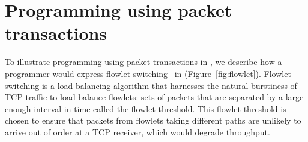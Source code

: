\section{Programming using packet transactions}
\label{s:transactions}

To illustrate programming using packet transactions in \pktlanguage, we
describe how a programmer would express flowlet switching~\cite{flowlets} in
\pktlanguage (Figure~\ref{fig:flowlet}).  Flowlet switching is a load balancing
algorithm that harnesses the natural burstiness of TCP traffic to load balance
flowlets: sets of packets that are separated by a large enough interval in time
called the flowlet threshold.  This flowlet threshold is chosen to ensure that
packets from flowlets taking different paths are unlikely to arrive out of
order at a TCP receiver, which would degrade throughput.

